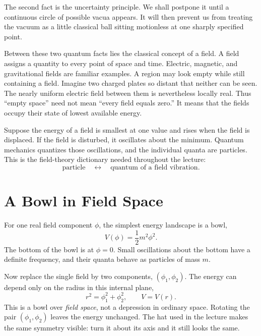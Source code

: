 The second fact is the uncertainty principle. We shall postpone it until a continuous circle of possible vacua appears. It will then prevent us from treating the vacuum as a little classical ball sitting motionless at one sharply specified point.

Between these two quantum facts lies the classical concept of a field. A field assigns a quantity to every point of space and time. Electric, magnetic, and gravitational fields are familiar examples. A region may look empty while still containing a field. Imagine two charged plates so distant that neither can be seen. The nearly uniform electric field between them is nevertheless locally real. Thus ``empty space'' need not mean ``every field equals zero.'' It means that the fields occupy their state of lowest available energy.

Suppose the energy of a field is smallest at one value and rises when the field is displaced. If the field is disturbed, it oscillates about the minimum. Quantum mechanics quantizes those oscillations, and the individual quanta are particles. This is the field-theory dictionary needed throughout the lecture:
\begin{equation}
\text{particle}
\quad\longleftrightarrow\quad
\text{quantum of a field vibration}.
\end{equation}

\section{A Bowl in Field Space}

For one real field component $\phi$, the simplest energy landscape is a bowl,
\begin{equation}
V(\phi)=\frac{1}{2}m^{2}\phi^{2}.
\end{equation}
The bottom of the bowl is at $\phi=0$. Small oscillations about the bottom have a definite frequency, and their quanta behave as particles of mass $m$.

Now replace the single field by two components, $(\phi_1,\phi_2)$. The energy can depend only on the radius in this internal plane,
\begin{equation}
r^{2}=\phi_1^{2}+\phi_2^{2},
\qquad
V=V(r).
\end{equation}
This is a bowl over \emph{field space}, not a depression in ordinary space. Rotating the pair $(\phi_1,\phi_2)$ leaves the energy unchanged. The hat used in the lecture makes the same symmetry visible: turn it about its axis and it still looks the same.

